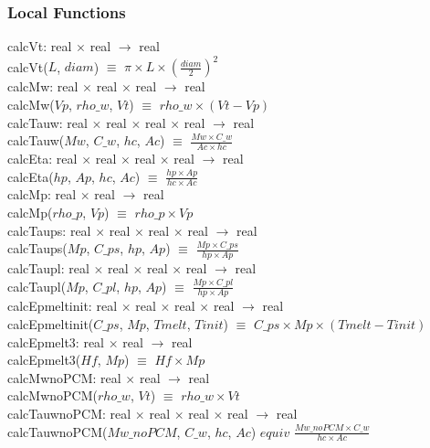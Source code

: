 \documentclass[12pt]{article}
\begin{document}
\subsubsection{Local Functions}

calcVt: real $\times$ real $\rightarrow$ real \\
calcVt($L$, $diam$) $\equiv$ $\pi \times L \times (\frac{diam}{2}) ^ 2$ \\
\newline
calcMw: real $\times$ real $\times$ real $\rightarrow$ real \\
calcMw($Vp$, $rho\_w$, $Vt$) $\equiv$ $rho\_w \times (Vt - Vp)$ \\
\newline
calcTauw: real $\times$ real $\times$ real $\times$ real $\rightarrow$ real \\
calcTauw($Mw$, $C\_w$, $hc$, $Ac$) $\equiv$ $\frac{Mw \times C\_w}{Ac \times hc}$ \\
\newline
calcEta: real $\times$ real $\times$ real $\times$ real $\rightarrow$ real \\
calcEta($hp$, $Ap$, $hc$, $Ac$) $\equiv$ $\frac{hp \times Ap}{hc \times Ac}$ \\
\newline
calcMp: real $\times$ real $\rightarrow$ real \\
calcMp($rho\_p$, $Vp$) $\equiv$ $rho\_p \times Vp$ \\
\newline
calcTaups: real $\times$ real $\times$ real $\times$ real $\rightarrow$ real \\
calcTaups($Mp$, $C\_ps$, $hp$, $Ap$) $\equiv$ $\frac{Mp \times C\_ps}{hp \times Ap}$ \\
\newline
calcTaupl: real $\times$ real $\times$ real $\times$ real $\rightarrow$ real \\
calcTaupl($Mp$, $C\_pl$, $hp$, $Ap$) $\equiv$ $\frac{Mp \times C\_pl}{hp \times Ap}$ \\
\newline
calcEpmeltinit: real $\times$ real $\times$ real $\times$ real $\rightarrow$ real \\
calcEpmeltinit($C\_ps$, $Mp$, $Tmelt$, $Tinit$) $\equiv$ $C\_ps \times Mp \times (Tmelt - Tinit)$ \\
\newline
calcEpmelt3: real $\times$ real $\rightarrow$ real \\
calcEpmelt3($Hf$, $Mp$) $\equiv$ $Hf \times Mp$ \\
\newline
calcMwnoPCM: real $\times$ real $\rightarrow$ real \\
calcMwnoPCM($rho\_w$, $Vt$) $\equiv$ $rho\_w \times Vt$ \\
\newline
calcTauwnoPCM: real $\times$ real $\times$ real $\times$ real $\rightarrow$ real \\
calcTauwnoPCM($Mw\_noPCM$, $C\_w$, $hc$, $Ac$) $equiv$ $\frac{Mw\_noPCM \times C\_w}{hc \times Ac}$ \\
\end{document}
